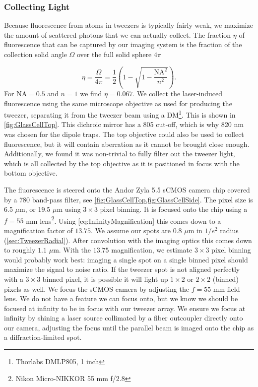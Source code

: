 \subsubsection*{Collecting Light}

Because fluorescence from atoms in tweezers is typically fairly weak, we maximize the amount of scattered photons that we can actually collect. 
The fraction $\eta$ of fluorescence that can be captured by our imaging system is the fraction of the collection solid angle $\Omega$ over the full solid sphere $4\pi$

\begin{equation}\label{eq:Collection}
    \eta = \frac{\Omega}{4\pi} = 
    \frac{1}{2}\left(1-\sqrt{1-\frac{\text{NA}^2}{n^2}}\right).
\end{equation}
For $\text{NA}=0.5$ and $n=1$ we find $\eta =0.067$. 
We collect the laser-induced fluorescence using the same microscope objective as used for producing the tweezer, separating it from the tweezer beam using a \acf{DM}\footnote{Thorlabs DMLP805, 1 inch}.
This is shown in \cref{fig:GlassCellTop}.
This dichroic mirror has a 805 cut-off, which is why 820 nm was chosen for the dipole traps.
The top objective could also be used to collect fluorescence, but it will contain aberration as it cannot be brought close enough. 
Additionally, we found it was non-trivial to fully filter out the tweezer light, which is all collected by the top objective as it is positioned in focus with the bottom objective. 

The fluorescence is steered onto the Andor Zyla 5.5 sCMOS camera chip covered by a 780 band-pass filter, see \cref{fig:GlassCellTop,fig:GlassCellSide}.
The pixel size is 6.5 $\mu$m, or 19.5 $\mu$m using $3\times3$ pixel binning. 
It is focused onto the chip using a $f= 55$ mm lens\footnote{Nikon Micro-NIKKOR 55 mm f/2.8}.
Using \cref{eq:InfinityMagnification} this comes down to a magnification factor of $13.75$.
We assume our spots are $0.8$ $\mu$m in $1/e^2$ radius (\cref{sec:TweezerRadial}).
After convolution with the imaging optics this comes down to roughly $1.1$ $\mu$m.
With the $13.75$ magnification, we estimate $3\times3$ pixel binning would probably work best: imaging a single spot on a single binned pixel should maximize the signal to noise ratio. 
If the tweezer spot is not aligned perfectly with a $3\times3$ binned pixel, it is possible it will light up $1\times2$ or $2\times2$ (binned) pixels as well.
We focus the sCMOS camera by adjusting the $f=55$ mm field lens.
We do not have a feature we can focus onto, but we know we should be focused at infinity to be in focus with our tweezer array. 
We ensure we focus at infinity by shining a laser source collimated by a fiber outcoupler directly onto our camera, adjusting the focus until the parallel beam is imaged onto the chip as a diffraction-limited spot. 


